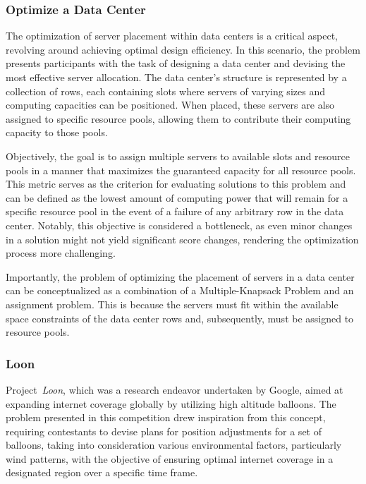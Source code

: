 \subsubsection*{Optimize a Data Center}
\label{subsubsec:hashcode-2015-qualification}

The optimization of server placement within data centers is a critical aspect,
revolving around achieving optimal design efficiency. In this scenario, the
problem presents participants with the task of designing a data center and
devising the most effective server allocation. The data center's structure is
represented by a collection of rows, each containing slots where servers of
varying sizes and computing capacities can be positioned. When placed, these
servers are also assigned to specific resource pools, allowing them to
contribute their computing capacity to those pools.

Objectively, the goal is to assign multiple servers to available slots and
resource pools in a manner that maximizes the guaranteed capacity for all
resource pools. This metric serves as the criterion for evaluating solutions to
this problem and can be defined as the lowest amount of computing power that
will remain for a specific resource pool in the event of a failure of any
arbitrary row in the data center. Notably, this objective is considered a
bottleneck, as even minor changes in a solution might not yield significant
score changes, rendering the optimization process more challenging.

Importantly, the problem of optimizing the placement of servers in a data center
can be conceptualized as a combination of a Multiple-Knapsack Problem and an
assignment problem. This is because the servers must fit within the available
space constraints of the data center rows and, subsequently, must be assigned to
resource pools.

\subsubsection*{Loon}
\label{subsubsec:hashcode-2015-final}

Project~\textit{Loon}, which was a research endeavor undertaken by Google, aimed at
expanding internet coverage globally by utilizing high altitude balloons. The
problem presented in this competition drew inspiration from this concept,
requiring contestants to devise plans for position adjustments for a set of
balloons, taking into consideration various environmental factors, particularly
wind patterns, with the objective of ensuring optimal internet coverage in a
designated region over a specific time frame.

